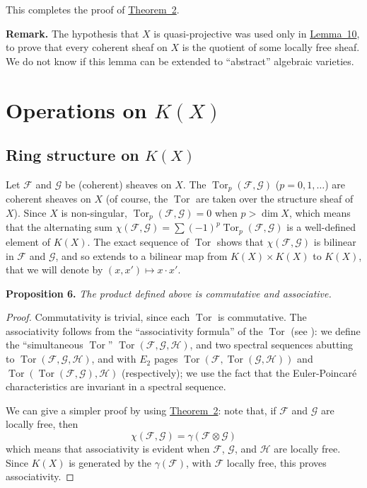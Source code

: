\documentclass{article}
\newenvironment{itenv}[1]
  {\phantomsection\par\medskip\noindent\textbf{#1.}\itshape}
  {\par\medskip}
\newenvironment{rmenv}[1]
  {\phantomsection\par\medskip\noindent\textbf{#1.}\rmfamily}
  {\par\medskip}
\newcommand{\scr}[1]{{\mathscr{#1}}}
\DeclareMathOperator{\Tor}{Tor}
\newcommand{\oldpage}[1]{\marginpar{\footnotesize$\Big\vert$ \textit{p.~#1}}}
\begin{document}
This completes the proof of \hyperref[theorem2]{Theorem~2}.

\begin{rmenv}{Remark}
  The hypothesis that $X$ is quasi-projective was used only in \hyperref[lemma10]{Lemma~10}, to prove that every coherent sheaf on $X$ is the quotient of some locally free sheaf.
  We do not know if this lemma can be extended to ``abstract'' algebraic varieties.
\end{rmenv}


\section{Operations on \texorpdfstring{$K(X)$}{K(X)}}
\label{section5}

\subsection{Ring structure on \texorpdfstring{$K(X)$}{K(X)}}
\label{subsection5a}

Let $\scr{F}$ and $\scr{G}$ be (coherent) sheaves on $X$.
The $\Tor_p(\scr{F},\scr{G})$ ($p=0,1,\ldots$) are coherent sheaves on $X$ (of course, the $\Tor$
\oldpage{109}
are taken over the structure sheaf of $X$).
Since $X$ is non-singular, $\Tor_p(\scr{F},\scr{G})=0$ when $p>\dim X$, which means that the alternating sum $\chi(\scr{F},\scr{G})=\sum(-1)^p\Tor_p(\scr{F},\scr{G})$ is a well-defined element of $K(X)$.
The exact sequence of $\Tor$ shows that $\chi(\scr{F},\scr{G})$ is bilinear in $\scr{F}$ and $\scr{G}$, and so extends to a bilinear map from $K(X)\times K(X)$ to $K(X)$, that we will denote by $(x,x')\mapsto x\cdot x'$.

\begin{itenv}{Proposition 6}
\label{proposition6}
  The product defined above is commutative and associative.
\end{itenv}

\begin{proof}
  Commutativity is trivial, since each $\Tor$ is commutative.
  The associativity follows from the ``associativity formula'' of the $\Tor$ (see \cite{3}):
  we define the ``simultaneous $\Tor$'' $\Tor(\scr{F},\scr{G},\scr{H})$, and two spectral sequences abutting to $\Tor(\scr{F},\scr{G},\scr{H})$, and with $E_2$ pages $\Tor(\scr{F},\Tor(\scr{G},\scr{H}))$ and $\Tor(\Tor(\scr{F},\scr{G}),\scr{H})$ (respectively);
  we use the fact that the Euler-Poincar\'{e} characteristics are invariant in a spectral sequence.

  We can give a simpler proof by using \hyperref[theorem2]{Theorem~2}:
  note that, if $\scr{F}$ and $\scr{G}$ are locally free, then
  \[
    \chi(\scr{F},\scr{G}) = \gamma(\scr{F}\otimes\scr{G})
  \]
  which means that associativity is evident when $\scr{F}$, $\scr{G}$, and $\scr{H}$ are locally free.
  Since $K(X)$ is generated by the $\gamma(\scr{F})$, with $\scr{F}$ locally free, this proves associativity.
\end{proof}
\end{document}
